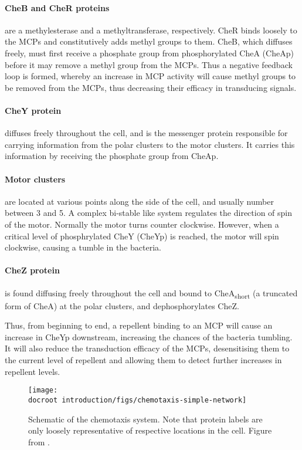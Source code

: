 \documentclass[../main.tex]{subfiles}
\begin{document}
\paragraph{CheB and CheR proteins} are a methylesterase and a methyltransferase, respectively. CheR binds loosely to the MCPs and constitutively adds methyl groups to them. CheB, which diffuses freely, must first receive a phosphate group from phosphorylated CheA (CheAp) before it may remove a methyl group from the MCPs. Thus a negative feedback loop is formed, whereby an increase in MCP activity will cause methyl groups to be removed from the MCPs, thus decreasing their efficacy in transducing signals.

\paragraph{CheY protein} diffuses freely throughout the cell, and is the messenger protein responsible for carrying information from the polar clusters to the motor clusters. It carries this information by receiving the phosphate group from CheAp.

\paragraph{Motor clusters} are located at various points along the side of the cell, and usually number between 3 and 5. A complex bi-stable like system regulates the direction of spin of the motor. Normally the motor turns counter clockwise. However, when a critical level of phosphrylated CheY (CheYp) is reached, the motor will spin clockwise, causing a tumble in the bacteria.

\paragraph{CheZ protein} is found diffusing freely throughout the cell and bound to CheA\textsubscript{short} (a truncated form of CheA) at the polar clusters, and dephosphorylates CheZ.

Thus, from beginning to end, a repellent binding to an MCP will cause an increase in CheYp downstream, increasing the chances of the bacteria tumbling. It will also reduce the transduction efficacy of the MCPs, desensitising them to the current level of repellent and allowing them to detect further increases in repellent levels.


\begin{figure}[h!]
\begin{center}
\texttt{[image: \\docroot introduction/figs/chemotaxis-simple-network]}
\caption[Schematic of the chemotaxis system]{Schematic of the chemotaxis system. Note that protein labels are only loosely representative of respective locations in the cell. Figure from \citet{lipkowfigs}.}
\label{fig:chemo:bubble}
\end{center}
\end{figure}
\end{document}
